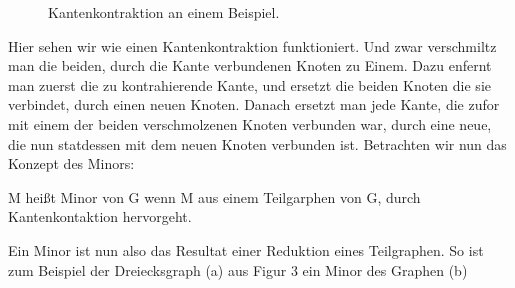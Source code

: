 \documentclass[runningheads]{llncs}
\begin{document}
\begin{figure}
    \begin{subfigure}{.24\textwidth}
        \centering
    \end{subfigure}
    \caption{Kantenkontraktion an einem Beispiel.}
\end{figure}

Hier sehen wir wie einen Kantenkontraktion funktioniert. Und zwar verschmiltz man die beiden, durch die Kante 
verbundenen Knoten zu Einem. Dazu enfernt man zuerst die zu kontrahierende Kante, und ersetzt die beiden Knoten die sie 
verbindet, durch einen neuen Knoten. Danach ersetzt man jede Kante, die zufor mit einem der beiden verschmolzenen Knoten 
verbunden war, durch eine neue, die nun statdessen mit dem neuen Knoten verbunden ist. Betrachten wir nun das Konzept des
Minors:
\begin{definition}[Minor]
    M heißt Minor von G wenn M aus einem Teilgarphen von G, durch Kantenkontaktion hervorgeht.
\end{definition}
Ein Minor ist nun also das Resultat einer Reduktion eines Teilgraphen.
So ist zum Beispiel der Dreiecksgraph (a) aus Figur 3 ein Minor des Graphen (b)
\end{document}
